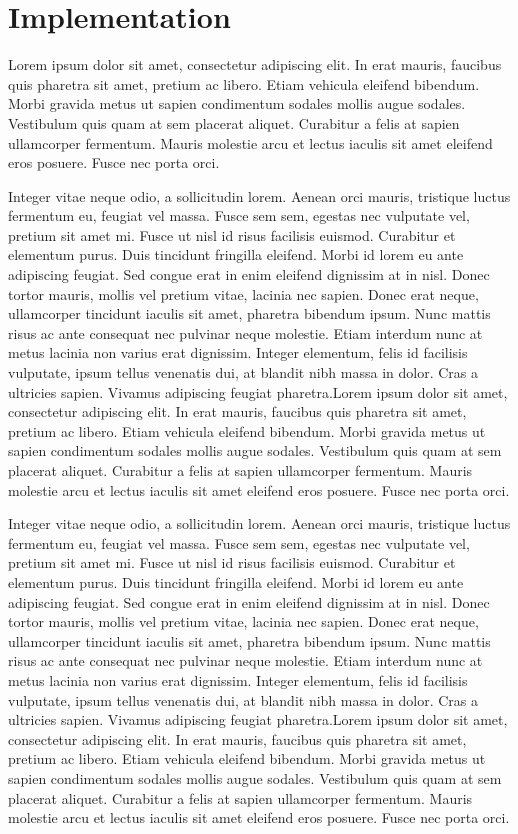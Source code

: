 \section{Implementation}
\label{sec:implementation}

Lorem ipsum dolor sit amet, consectetur adipiscing elit. In erat mauris, faucibus quis pharetra sit amet, pretium ac libero. Etiam vehicula eleifend bibendum. Morbi gravida metus ut sapien condimentum sodales mollis augue sodales. Vestibulum quis quam at sem placerat aliquet. Curabitur a felis at sapien ullamcorper fermentum. Mauris molestie arcu et lectus iaculis sit amet eleifend eros posuere. Fusce nec porta orci.

Integer vitae neque odio, a sollicitudin lorem. Aenean orci mauris, tristique luctus fermentum eu, feugiat vel massa. Fusce sem sem, egestas nec vulputate vel, pretium sit amet mi. Fusce ut nisl id risus facilisis euismod. Curabitur et elementum purus. Duis tincidunt fringilla eleifend. Morbi id lorem eu ante adipiscing feugiat. Sed congue erat in enim eleifend dignissim at in nisl. Donec tortor mauris, mollis vel pretium vitae, lacinia nec sapien. Donec erat neque, ullamcorper tincidunt iaculis sit amet, pharetra bibendum ipsum. Nunc mattis risus ac ante consequat nec pulvinar neque molestie. Etiam interdum nunc at metus lacinia non varius erat dignissim. Integer elementum, felis id facilisis vulputate, ipsum tellus venenatis dui, at blandit nibh massa in dolor. Cras a ultricies sapien. Vivamus adipiscing feugiat pharetra.Lorem ipsum dolor sit amet, consectetur adipiscing elit. In erat mauris, faucibus quis pharetra sit amet, pretium ac libero. Etiam vehicula eleifend bibendum. Morbi gravida metus ut sapien condimentum sodales mollis augue sodales. Vestibulum quis quam at sem placerat aliquet. Curabitur a felis at sapien ullamcorper fermentum. Mauris molestie arcu et lectus iaculis sit amet eleifend eros posuere. Fusce nec porta orci.

Integer vitae neque odio, a sollicitudin lorem. Aenean orci mauris, tristique luctus fermentum eu, feugiat vel massa. Fusce sem sem, egestas nec vulputate vel, pretium sit amet mi. Fusce ut nisl id risus facilisis euismod. Curabitur et elementum purus. Duis tincidunt fringilla eleifend. Morbi id lorem eu ante adipiscing feugiat. Sed congue erat in enim eleifend dignissim at in nisl. Donec tortor mauris, mollis vel pretium vitae, lacinia nec sapien. Donec erat neque, ullamcorper tincidunt iaculis sit amet, pharetra bibendum ipsum. Nunc mattis risus ac ante consequat nec pulvinar neque molestie. Etiam interdum nunc at metus lacinia non varius erat dignissim. Integer elementum, felis id facilisis vulputate, ipsum tellus venenatis dui, at blandit nibh massa in dolor. Cras a ultricies sapien. Vivamus adipiscing feugiat pharetra.Lorem ipsum dolor sit amet, consectetur adipiscing elit. In erat mauris, faucibus quis pharetra sit amet, pretium ac libero. Etiam vehicula eleifend bibendum. Morbi gravida metus ut sapien condimentum sodales mollis augue sodales. Vestibulum quis quam at sem placerat aliquet. Curabitur a felis at sapien ullamcorper fermentum. Mauris molestie arcu et lectus iaculis sit amet eleifend eros posuere. Fusce nec porta orci.

